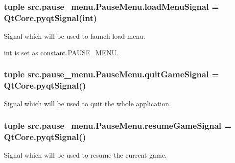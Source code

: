 \subsubsection[{load\+Menu\+Signal}]{\setlength{\rightskip}{0pt plus 5cm}tuple src.\+pause\+\_\+menu.\+Pause\+Menu.\+load\+Menu\+Signal = Qt\+Core.\+pyqt\+Signal(int)\hspace{0.3cm}{\ttfamily [static]}}\label{classsrc_1_1pause__menu_1_1_pause_menu_ae1851c6cab071ed1a4473320110432d8}


Signal which will be used to launch load menu. 

int is set as \textquotesingle{}constant.\+P\+A\+U\+S\+E\+\_\+\+M\+E\+N\+U\textquotesingle{}. \hypertarget{classsrc_1_1pause__menu_1_1_pause_menu_aea554e6749ca45f516618711530a1acd}{}
\subsubsection[{quit\+Game\+Signal}]{\setlength{\rightskip}{0pt plus 5cm}tuple src.\+pause\+\_\+menu.\+Pause\+Menu.\+quit\+Game\+Signal = Qt\+Core.\+pyqt\+Signal()\hspace{0.3cm}{\ttfamily [static]}}\label{classsrc_1_1pause__menu_1_1_pause_menu_aea554e6749ca45f516618711530a1acd}


Signal which will be used to quit the whole application. 

\hypertarget{classsrc_1_1pause__menu_1_1_pause_menu_a0b97feb3939cd6be81c71ba6dbe67669}{}
\subsubsection[{resume\+Game\+Signal}]{\setlength{\rightskip}{0pt plus 5cm}tuple src.\+pause\+\_\+menu.\+Pause\+Menu.\+resume\+Game\+Signal = Qt\+Core.\+pyqt\+Signal()\hspace{0.3cm}{\ttfamily [static]}}\label{classsrc_1_1pause__menu_1_1_pause_menu_a0b97feb3939cd6be81c71ba6dbe67669}


Signal which will be used to resume the current game. 

